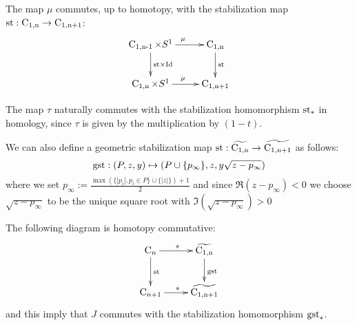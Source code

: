 The map $\mu$ commutes, up to homotopy, with the stabilization map $\mathrm{st}: \operatorname{C_{1,n}} \to \operatorname{C_{1,n+1}}$:
$$
\xymatrix{
\confm{n-1} \times S^1 \ar[d]^{\stab \times \Id} \ar[r]^\mu& \confm{n} \ar[d]^\stab\\
\confm{n} \times S^1 \ar[r]^\mu & \confm{n+1}
}
$$


The map $\tau$ naturally commutes with the stabilization homomorphism $\mathrm{st}_*$ in homology, since $\tau$ is given by the multiplication by $(1-t)$.


We can also define a geometric stabilization map $\mathrm{st}: \widetilde{\operatorname{C_{1,n}}} \to \widetilde{\operatorname{C_{1,n+1}}}$ as follows:
$$
\mathrm{gst}:(P, z, y) \mapsto (P \cup \{p_{\infty}\}, z, y \sqrt{z-p_{\infty}})
$$
where we set $p_\infty:= \frac{\max ( \{|p_i|, p_i \in P \} \cup \{|z|\})+1}{2}$ and since $\Re(z-p_{\infty}) < 0$ we choose
$\sqrt{z-p_{\infty}}$ to be the unique square root with $\Im(\sqrt{z-p_{\infty}}) >0$

The following diagram is homotopy commutative:
$$
\xymatrix{
	\conf_n \ar[d]^{\stab} \ar[r]^s& \confmd{n} \ar[d]^\gstab\\
	\conf_{n+1}  \ar[r]^s & \confmd{n+1}
}
$$
and this imply that $J$ commutes with the stabilization homomorphism $\mathrm{gst}_*$.

